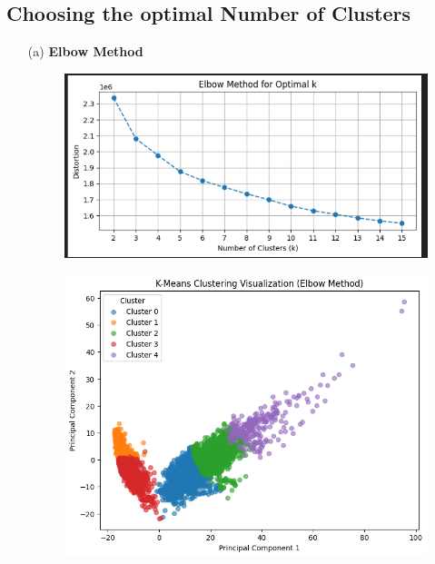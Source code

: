 \documentclass{article}
\begin{document}
\subsection{Choosing the optimal Number of Clusters}
\begin{enumerate}
    \item [(a)] \textbf{Elbow Method}
    \begin{figure}[H]
        \centering
        \begin{minipage}{0.5\textwidth}
            \centering
            \includegraphics[width=\textwidth]{elbow_meth.png}
            \label{fig:elbow_method}
        \end{minipage}
        \hfill
        \begin{minipage}{0.45\textwidth}
            \centering
            \includegraphics[width=\textwidth]{elbow_graph.png}

\end{minipage}
\end{figure}
\end{enumerate}
\end{document}
